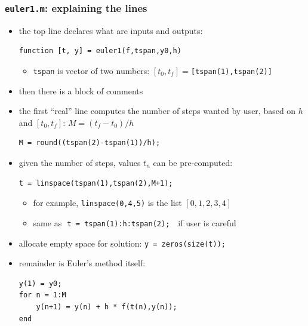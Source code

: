 \documentclass[urlcolor=blue,dvipsnames]{beamer}
\begin{document}
\begin{frame}[fragile]
\frametitle{\texttt{euler1.m}: explaining the lines}

\begin{itemize}
\item the top line declares what are inputs and outputs:

{\color{Green}
\begin{Verbatim}[fontsize=\small]
function [t, y] = euler1(f,tspan,y0,h)
\end{Verbatim}
}
    \begin{itemize}
    \item \texttt{tspan} is vector of two numbers: \footnotesize $[t_0,t_f]=$\texttt{[tspan(1),tspan(2)]}
    \end{itemize}
\item then there is a block of comments
\item the first ``real'' line computes the number of steps wanted by user, based on $h$ and $[t_0,t_f]$:  \quad $M=(t_f-t_0)/h$

{\color{Green}
\begin{Verbatim}[fontsize=\small]
M = round((tspan(2)-tspan(1))/h);
\end{Verbatim}
}
\item given the number of steps, values $t_n$ can be pre-computed:

{\color{Green}
\begin{Verbatim}[fontsize=\small]
t = linspace(tspan(1),tspan(2),M+1);
\end{Verbatim}
}
    \begin{itemize}
    \item for example, \texttt{linspace(0,4,5)} is the list $[0,1,2,3,4]$
    \item same as \,\,\texttt{t = tspan(1):h:tspan(2);} \,\, if user is careful
    \end{itemize}

\item allocate empty space for solution: {\color{Green}\texttt{y = zeros(size(t));}}
\item \begin{minipage}[t]{0.3\textwidth}
remainder is Euler's method itself:
\end{minipage}
\quad
\begin{minipage}[t]{0.55\textwidth}
\vspace{-3mm}
{\color{Green}
\begin{Verbatim}[fontsize=\small]
y(1) = y0;
for n = 1:M
    y(n+1) = y(n) + h * f(t(n),y(n));
end
\end{Verbatim}
}
\end{minipage}
\end{itemize}

\end{frame}
\end{document}
